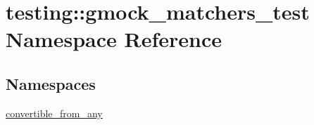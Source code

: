 \hypertarget{namespacetesting_1_1gmock__matchers__test}{}\section{testing\+::gmock\+\_\+matchers\+\_\+test Namespace Reference}
\label{namespacetesting_1_1gmock__matchers__test}
\subsection*{Namespaces}
\begin{DoxyCompactItemize}
\item 
 \mbox{\hyperlink{namespacetesting_1_1gmock__matchers__test_1_1convertible__from__any}{convertible\+\_\+from\+\_\+any}}
\end{DoxyCompactItemize}
